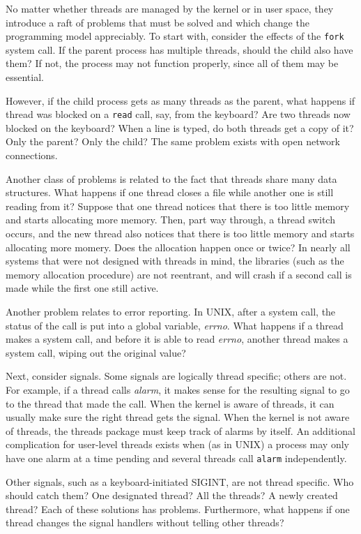 \documentclass{book}
\newcommand {\sys} [1] {\textsl{#1}}
\newcommand {\cmd} [1] {\texttt{#1}}
\begin{document}
No matter whether threads are managed by the kernel or in user space, they introduce a raft of problems
that must be solved and which change the programming model appreciably.
To start with, consider the effects of the \cmd{fork} system call.
If the parent process has multiple threads, should the child also have them?
If not, the process may not function properly, since all of them may be essential.

However, if the child process gets as many threads as the parent, 
what happens if thread was blocked on a \cmd{read} call, say, from the keyboard?
Are two threads now blocked on the keyboard?
When a line is typed, do both threads get a copy of it?
Only the parent?
Only the child?
The same problem exists with open network connections.

Another class of problems is related to the fact that threads share many data structures.
What happens if one thread closes a file while another one is still reading from it?
Suppose that one thread notices that there is too little memory and starts allocating more memory.
Then, part way through, a thread switch occurs, 
and the new thread also notices that there is too little memory and starts allocating more momery.
Does the allocation happen once or twice?
In nearly all systems that were not designed with threads in mind,
the libraries (such as the memory allocation procedure) are not reentrant,
and will crash if a second call is made while the first one still active.

Another problem relates to error reporting.
In UNIX, after a system call, the status of the call is put into a global variable, \sys{errno}.
What happens if a thread makes a system call, and before it is able to read \sys{errno},
another thread makes a system call, wiping out the original value?

Next, consider signals.
Some signals are logically thread specific; others are not.
For example, if a thread calls \sys{alarm}, it makes sense for the resulting signal to go to the thread that made the call.
When the kernel is aware of threads, it can usually make sure the right thread gets the signal.
When the kernel is not aware of threads, the threads package must keep track of alarms by itself.
An additional complication for user-level threads exists when (as in UNIX) a process may only have one alarm at a time pending
and several threads call \cmd{alarm} independently.

Other signals, such as a keyboard-initiated SIGINT, are not thread specific.
Who should catch them?
One designated thread?
All the threads?
A newly created thread?
Each of these solutions has problems.
Furthermore, what happens if one thread changes the signal handlers without telling other threads?
\end{document}
